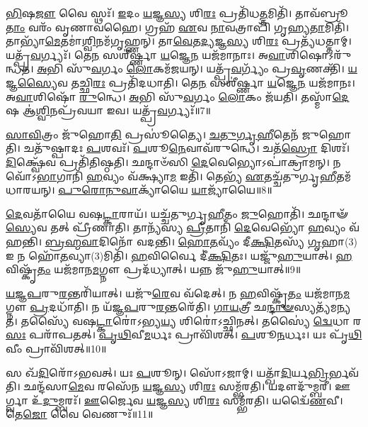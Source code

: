 \-\ul{𑌭𑌿}\-𑌷\-\ul{𑌜𑍗} 𑌵𑍈 𑌸𑍍𑌥𑌃᳴। 
\-\ul{𑌇}\-𑌦𑌂 \ul{𑌯}\-𑌜𑍍𑌞\-\ul{𑌸𑍍𑌯} 𑌶𑌿\-\ul{𑌰𑌃} 𑌪𑍍𑌰𑌤𑌿᳴𑌧\-\ul{𑌤𑍍𑌤}\-𑌮𑌿𑌤𑌿᳴। 
𑌤𑌾𑌵᳴𑌬𑍍𑌰𑍂\-\ul{𑌤𑌾𑌂} 𑌵𑌰𑌂᳴ 𑌵𑍃𑌣𑌾𑌵𑌹𑍈। 
𑌗𑍍𑌰𑌹᳴ \ul{𑌏}\-𑌵 \ul{𑌨𑌾}\-𑌵𑌤𑍍𑌰𑌾𑌪𑌿᳴ 𑌗𑍃𑌹𑍍𑌯\-\ul{𑌤𑌾}\-𑌮𑌿𑌤𑌿᳴। 
𑌤𑌾𑌭𑍍𑌯𑌾᳴\-\ul{𑌮𑍇}\-𑌤𑌮𑌾॑\-\ul{𑌶𑍍𑌵𑌿}\-𑌨𑌮᳴𑌗𑍃𑌹𑍍𑌣𑌨𑍍। 
𑌤𑌾\-\ul{𑌵𑍇}\-𑌤\-\ul{𑌦𑍍𑌯}\-𑌜𑍍𑌞\-\ul{𑌸𑍍𑌯} 𑌶𑌿\-\ul{𑌰𑌃} 𑌪𑍍𑌰𑌤𑍍𑌯᳴𑌧𑌤𑍍𑌤𑌾𑌮𑍍। 
𑌯𑌤𑍍𑌪𑍍𑌰᳴\-\ul{𑌵}\-𑌰𑍍𑌗𑍍𑌯𑌃᳴। 
𑌤𑍇\-\ul{𑌨} 𑌸𑌶𑍀॑𑌰𑍍𑌷𑍍𑌣𑌾 \ul{𑌯}\-𑌜𑍍𑌞𑍇\-\ul{𑌨} 𑌯𑌜᳴𑌮𑌾𑌨𑌾𑌃। 
𑌅\-\ul{𑌵𑌾}\-𑌶𑌿𑌷𑍋\-𑌽𑌰𑍁᳴𑌨𑍍𑌧𑌤। 
\-\ul{𑌅}\-𑌭𑌿 𑌸𑍁᳴\-\ul{𑌵}\-𑌰𑍍𑌗𑌂 \ul{𑌲𑍋}\-𑌕𑌮᳴𑌜𑌯𑌨𑍍। 
𑌯𑌤𑍍𑌪𑍍𑌰᳴\-\ul{𑌵}\-𑌰𑍍𑌗𑍍𑌯𑌂᳴ 𑌪𑍍𑌰\-\ul{𑌵𑍃}\-𑌣𑌕𑍍𑌤𑌿᳴। 
\-\ul{𑌯}\-𑌜𑍍𑌞\-\ul{𑌸𑍍𑌯𑍈}\-𑌵 𑌤𑌚𑍍𑌛𑌿\-\ul{𑌰𑌃} 𑌪𑍍𑌰𑌤𑌿᳴𑌦𑌧𑌾𑌤𑌿। 
𑌤𑍇\-\ul{𑌨} 𑌸𑌶𑍀॑𑌰𑍍𑌷𑍍𑌣𑌾 \ul{𑌯}\-𑌜𑍍𑌞𑍇\-\ul{𑌨} 𑌯𑌜᳴𑌮𑌾𑌨𑌃। 
𑌅\-\ul{𑌵𑌾}\-𑌶𑌿𑌷𑍋᳴ \ul{𑌰𑍁}\-𑌨𑍍𑌧𑍇। 
\-\ul{𑌅}\-𑌭𑌿 𑌸𑍁᳴\-\ul{𑌵}\-𑌰𑍍𑌗𑌂 \ul{𑌲𑍋}\-𑌕𑌂 𑌜᳴𑌯𑌤𑌿। 
𑌤𑌸𑍍𑌮𑌾᳴\-\ul{𑌦𑍇}\-𑌷 𑌆॑\-\ul{𑌶𑍍𑌵𑌿}\-𑌨𑌪𑍍𑌰᳴𑌵𑌯𑌾 𑌇𑌵। 
𑌯𑌤𑍍𑌪𑍍𑌰᳴\-\ul{𑌵}\-𑌰𑍍𑌗𑍍𑌯𑌃᳴॥7॥
\anuvakamend[\-\ul{𑌉}\-\-\ul{𑌤𑍍𑌕}\-𑌰𑍋 𑌹𑍍𑌯𑍇᳴𑌤𑍇 𑌤𑍃᳴𑌨𑍍𑌦𑌨𑍍𑌤𑌿 𑌮𑌹𑌾𑌵𑍀\-\ul{𑌰}\-𑌤𑍍𑌵𑌮᳴𑌬𑍍𑌰𑍁𑌵𑌨𑍍𑌨𑌜𑌯\-\ul{𑌨𑍍𑌥𑍍𑌸}\-𑌪𑍍𑌤 𑌚᳴]

\-\ul{𑌸𑌾}\-\-\ul{𑌵𑌿}\-𑌤𑍍𑌰𑌂 𑌜𑍁᳴𑌹𑍋\-\ul{𑌤𑌿} 𑌪𑍍𑌰𑌸𑍂॑𑌤𑍍𑌯𑍈। 
\-\ul{𑌚}\-\-\ul{𑌤𑍁}\-\-\ul{𑌰𑍍𑌗𑍃}\-\-\ul{𑌹𑍀}\-𑌤𑍇𑌨᳴ 𑌜𑍁𑌹𑍋𑌤𑌿। 
𑌚𑌤𑍁᳴𑌷𑍍𑌪𑌾𑌦𑌃 \ul{𑌪}\-𑌶𑌵𑌃᳴। 
\-\ul{𑌪}\-𑌶𑍂\-\ul{𑌨𑍇}\-𑌵𑌾𑌵᳴𑌰𑍁𑌨𑍍𑌧𑍇। 
𑌚𑌤᳴\-\ul{𑌸𑍍𑌰𑍋} 𑌦𑌿𑌶𑌃᳴। 
\-\ul{𑌦𑌿}\-𑌕𑍍𑌷𑍍𑌵𑍇᳴𑌵 𑌪𑍍𑌰𑌤𑌿᳴𑌤𑌿𑌷𑍍𑌠𑌤𑌿। 
𑌛𑌨𑍍𑌦𑌾𑍞᳴𑌸𑌿 \ul{𑌦𑍇}\-𑌵𑍇𑌭𑍍𑌯𑍋𑌽𑌪𑌾॑𑌕𑍍𑌰𑌾𑌮𑌨𑍍। 
𑌨 𑌵𑍋᳴𑌽\-\ul{𑌭𑌾}\-𑌗𑌾𑌨𑌿᳴ \ul{𑌹}\-𑌵𑍍𑌯𑌂 𑌵᳴𑌕𑍍𑌷𑍍𑌯𑌾\-\ul{𑌮} 𑌇𑌤𑌿᳴। 
𑌤𑍇𑌭𑍍𑌯᳴ \ul{𑌏}\-𑌤𑌚𑍍𑌚᳴𑌤𑍁𑌰𑍍𑌗𑍃\-\ul{𑌹𑍀}\-𑌤𑌮᳴𑌧𑌾𑌰𑌯𑌨𑍍। 
\-\ul{𑌪𑍁}\-\-\ul{𑌰𑍋}\-\-\ul{𑌨𑍁}\-\-\ul{𑌵𑌾}\-𑌕𑍍𑌯𑌾᳴𑌯𑍈 \ul{𑌯𑌾}\-𑌜𑍍𑌯𑌾᳴𑌯𑍈॥8॥

\-\ul{𑌦𑍇}\-𑌵𑌤𑌾᳴𑌯𑍈 𑌵𑌷\-\ul{𑌟𑍍𑌕𑌾}\-𑌰𑌾𑌯᳴। 
𑌯𑌚𑍍𑌚᳴𑌤𑍁𑌰𑍍𑌗𑍃\-\ul{𑌹𑍀}\-𑌤𑌂 \ul{𑌜𑍁}\-𑌹𑍋𑌤𑌿᳴। 
𑌛𑌨𑍍𑌦𑌾𑍟᳴\-\ul{𑌸𑍍𑌯𑍇}\-𑌵 𑌤𑌤𑍍 𑌪𑍍𑌰𑍀᳴𑌣𑌾𑌤𑌿। 
𑌤𑌾𑌨𑍍𑌯᳴𑌸𑍍𑌯 \ul{𑌪𑍍𑌰𑍀}\-𑌤𑌾𑌨𑌿᳴ \ul{𑌦𑍇}\-𑌵𑍇𑌭𑍍𑌯𑍋᳴ \ul{𑌹}\-𑌵𑍍𑌯𑌂 𑌵᳴𑌹𑌨𑍍𑌤𑌿। 
\-\ul{𑌬𑍍𑌰}\-\-\ul{𑌹𑍍𑌮}\-\-\ul{𑌵𑌾}\-𑌦𑌿𑌨𑍋᳴ 𑌵𑌦𑌨𑍍𑌤𑌿। 
\-\ul{𑌹𑍋}\-\-\ul{𑌤}\-𑌵𑍍𑌯𑌂᳴ 𑌦𑍀\-\ul{𑌕𑍍𑌷𑌿}\-𑌤𑌸𑍍𑌯᳴ \ul{𑌗𑍃}\-𑌹𑌾(3)𑌇 𑌨 𑌹𑍋᳴\-\ul{𑌤}\-𑌵𑍍𑌯𑌾(3)𑌮𑌿𑌤𑌿᳴। 
\-\ul{𑌹}\-𑌵𑌿𑌰𑍍\mbox{}𑌵𑍈 𑌦𑍀॑\-\ul{𑌕𑍍𑌷𑌿}\-𑌤𑌃। 
𑌯𑌜𑍍𑌜𑍁᳴\-\ul{𑌹𑍁}\-𑌯𑌾𑌤𑍍। 
\-\ul{𑌹}\-𑌵𑌿𑌷𑍍𑌕𑍃᳴\-\ul{𑌤𑌂} 𑌯𑌜᳴𑌮𑌾𑌨\-\ul{𑌮}\-𑌗𑍍𑌨𑍗 𑌪𑍍𑌰𑌦᳴𑌧𑍍𑌯𑌾𑌤𑍍। 
𑌯𑌨𑍍𑌨 𑌜𑍁᳴\-\ul{𑌹𑍁}\-𑌯𑌾𑌤𑍍॥9॥

\-\ul{𑌯}\-\-\ul{𑌜𑍍𑌞}\-\-\ul{𑌪}\-𑌰𑍁\-\ul{𑌰}\-𑌨𑍍𑌤𑌰𑌿᳴𑌯𑌾𑌤𑍍। 
𑌯𑌜𑍁᳴\-\ul{𑌰𑍇}\-𑌵 𑌵᳴𑌦𑍇𑌤𑍍। 
𑌨 \ul{𑌹}\-𑌵𑌿𑌷𑍍𑌕𑍃᳴\-\ul{𑌤𑌂} 𑌯𑌜᳴𑌮𑌾𑌨\-\ul{𑌮}\-𑌗𑍍𑌨𑍗 \ul{𑌪𑍍𑌰}\-𑌦𑌧𑌾᳴𑌤𑌿। 
𑌨 𑌯᳴𑌜𑍍𑌞\-\ul{𑌪}\-𑌰𑍁\-\ul{𑌰}\-𑌨𑍍𑌤𑌰𑍇᳴𑌤𑌿। 
\-\ul{𑌗𑌾}\-\-\ul{𑌯}\-𑌤𑍍𑌰𑍀 𑌛\-\ul{𑌨𑍍𑌦𑌾}\-\-\ul{𑍟}\-𑌸𑍍𑌯𑌤𑍍𑌯᳴𑌮𑌨𑍍𑌯𑌤। 
𑌤𑌸𑍍𑌯𑍈᳴ 𑌵𑌷\-\ul{𑌟𑍍𑌕𑌾}\-𑌰𑍋॑𑌽𑌭𑍍𑌯\-\ul{𑌯𑍍𑌯} 𑌶𑌿𑌰𑍋॑𑌽𑌚𑍍𑌛𑌿𑌨𑌤𑍍। 
𑌤𑌸𑍍𑌯𑍈॑ \ul{𑌦𑍍𑌵𑍇}\-𑌧𑌾 𑌰\-\ul{𑌸𑌃} 𑌪𑌰𑌾᳴𑌪𑌤𑌤𑍍। 
\-\ul{𑌪𑍃}\-\-\ul{𑌥𑌿}\-𑌵𑍀\-\ul{𑌮}\-𑌰𑍍𑌧𑌃 𑌪𑍍𑌰𑌾𑌵𑌿᳴𑌶𑌤𑍍। 
\-\ul{𑌪}\-𑌶𑍂\-\ul{𑌨}\-𑌰𑍍𑌧𑌃। 
𑌯𑌃 𑌪𑍃᳴\-\ul{𑌥𑌿}\-𑌵𑍀𑌂 𑌪𑍍𑌰𑌾𑌵𑌿᳴𑌶𑌤𑍍॥10॥

𑌸 𑌖᳴\-\ul{𑌦𑌿}\-𑌰𑍋᳴𑌽𑌭𑌵𑌤𑍍। 
𑌯𑌃 \ul{𑌪}\-𑌶𑍂𑌨𑍍। 
𑌸𑍋᳴𑌽𑌜𑌾𑌮𑍍। 
𑌯𑌤𑍍𑌖𑌾᳴\-\ul{𑌦𑌿}\-𑌰𑍍𑌯\-\ul{𑌭𑍍𑌰𑌿}\-𑌰𑍍𑌭\-𑌵᳴𑌤𑌿। 
𑌛𑌨𑍍𑌦᳴𑌸𑌾\-\ul{𑌮𑍇}\-𑌵 𑌰𑌸𑍇᳴𑌨 \ul{𑌯}\-𑌜𑍍𑌞\-\ul{𑌸𑍍𑌯} 𑌶𑌿\-\ul{𑌰𑌃} 𑌸𑌮𑍍𑌭᳴𑌰𑌤𑌿। 
𑌯𑌦𑍗𑌦𑍁᳴𑌮𑍍𑌬𑌰𑍀। 
𑌊𑌰𑍍𑌗𑍍𑌵𑌾 𑌉᳴\-\ul{𑌦𑍁}\-𑌮𑍍𑌬𑌰𑌃᳴। 
\-\ul{𑌊}\-𑌰𑍍𑌜𑍈𑌵 \ul{𑌯}\-𑌜𑍍𑌞\-\ul{𑌸𑍍𑌯} 𑌶𑌿\-\ul{𑌰𑌃} 𑌸𑌮𑍍𑌭᳴𑌰𑌤𑌿। 
𑌯𑌦𑍍𑌵𑍈᳴\-\ul{𑌣}\-𑌵𑍀। 
𑌤𑍇\-\ul{𑌜𑍋} 𑌵𑍈 𑌵𑍇𑌣𑍁𑌃᳴॥11॥

